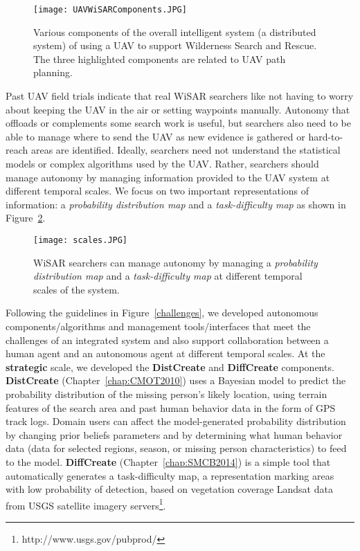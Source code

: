 \begin{figure}
\centering
\texttt{[image: UAVWiSARComponents.JPG]}
\caption{Various components of the overall intelligent system (a distributed system) of using a UAV to support Wilderness Search and Rescue. The three highlighted components are related to UAV path planning.}
\label{SystemComponents}
\end{figure}

Past UAV field trials indicate that real WiSAR searchers like not having to worry about keeping the UAV in the air or setting waypoints manually. Autonomy that offloads or complements some search work is useful, but searchers also need to be able to manage where to send the UAV as new evidence is gathered or hard-to-reach areas are identified. Ideally, searchers need not understand the statistical models or complex algorithms used by the UAV. Rather, searchers should manage autonomy by managing information provided to the UAV system at different temporal scales. We focus on two important representations of information: a \textit{probability distribution map} and a \textit{task-difficulty map} as shown in Figure~\ref{Scales}.

\begin{figure}
\centering
\texttt{[image: scales.JPG]}
\caption{WiSAR searchers can manage autonomy by managing a \textit{probability distribution map} and a \textit{task-difficulty map} at different temporal scales of the system.}
\label{Scales}
\end{figure}

Following the guidelines in Figure~\ref{challenges}, we developed autonomous components/algorithms and management tools/interfaces that meet the challenges of an integrated system and also support collaboration between a human agent and an autonomous agent at different temporal scales. At the \textbf{strategic} scale, we developed the \textbf{DistCreate} and \textbf{DiffCreate} components. \textbf{DistCreate} (Chapter~\ref{chap:CMOT2010}) uses a Bayesian model to predict the probability distribution of the missing person's likely location, using terrain features of the search area and past human behavior data in the form of GPS track logs. Domain users can affect the model-generated probability distribution by changing prior beliefs parameters and by determining what human behavior data (data for selected regions, season, or missing person characteristics) to feed to the model. \textbf{DiffCreate} (Chapter~\ref{chap:SMCB2014}) is a simple tool that automatically generates a task-difficulty map, a representation marking areas with low probability of detection, based on vegetation coverage Landsat data from USGS satellite imagery servers\footnote{http://www.usgs.gov/pubprod/}. 

